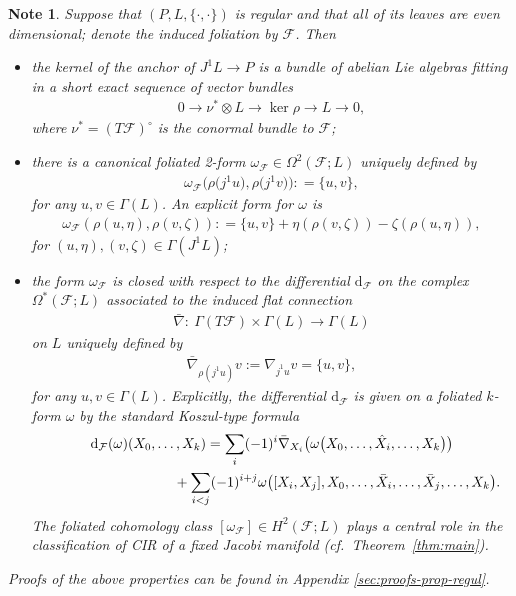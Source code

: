 \documentclass[10pt,a4paper]{amsart}
\numberwithin{equation}{section}
\newtheorem{Note}[Theorem]{Note}
\newcommand{\de}{\mathrm{d}} %
\newcommand{\JM}{(P,L,\{\cdot,\cdot\})} %
\begin{document}
\begin{Note}\label{obs:prop_jac_even}
Suppose that $\JM$ is regular and that all of its leaves are even dimensional; denote the induced foliation by $\mathcal{F}$. Then
 \begin{itemize}\itemsep=0pt
 \item the kernel of the anchor of $J^1L \to P$ is a bundle of abelian Lie algebras f\/itting in a short exact sequence of vector bundles
 \begin{gather} \label{eq:38}
 0 \to \nu^* \otimes L \to \ker \rho \to L \to 0,
 \end{gather}
 where $\nu^* = \left( T \mathcal{F}\right)^{\circ}$ is the conormal bundle to $\mathcal{F}$;
 \item there is a canonical foliated 2-form $\omega_{\mathcal{F}} \in\Omega^2(\mathcal{F};L)$ uniquely def\/ined by
 \begin{gather} \label{eq:29}
 \omega_{\mathcal{F}}\big(\rho\big(j^1 u\big), \rho\big(j^1 v\big)\big) : = \{u,v\},
 \end{gather}
 for any $u,v \in \Gamma(L)$. An explicit form for $\omega$ is
 \begin{gather*}
 \omega_{\mathcal{F}}(\rho(u,\eta),\rho(v,\zeta)) : = \{u,v\} + \eta(\rho(v,\zeta)) - \zeta(\rho(u,\eta)),
 \end{gather*}
 for $(u,\eta), (v,\zeta) \in \Gamma(J^1 L)$;
\item the form $\omega_{\mathcal{F}}$ is closed with respect to the dif\/ferential $\de_{\mathcal{F}}$ on the complex $\Omega^* (\mathcal{F};L)$ associated to the induced f\/lat connection
 \begin{gather*}%
 \bar{\nabla} \colon \ \Gamma(T \mathcal{F}) \times \Gamma(L) \to \Gamma(L)
 \end{gather*}
 on $L$ uniquely def\/ined by
 \begin{gather} \label{eq:26}
 \bar{\nabla}_{\rho(j^1u)} v := \nabla_{j^1 u}v = \{u,v\},
 \end{gather}
 for any $u,v \in \Gamma(L)$. Explicitly, the dif\/ferential $\de_{\mathcal{F}}$ is given on a foliated $k$-form $\omega$ by the standard Koszul-type formula
 \begin{gather*}
 \de_{\mathcal{F}}(\omega)(X_0,\ldots,X_k)= \sum_i(-1)^i\bar\nabla_{X_i}\big(\omega\big(X_0,\ldots,\hat X_i,\ldots, X_k\big)\big)\\
\hphantom{\de_{\mathcal{F}}(\omega)(X_0,\ldots,X_k)=}{} +\sum_{i<j}(-1)^{i+j}\omega\big([X_i,X_j], X_0,\ldots,\bar X_i,\ldots, \bar X_j,\ldots, X_k \big).
\end{gather*}
The foliated cohomology class $ [\omega_{\mathcal{F}}]\in H^2(\mathcal{F};L)$ plays a central role in the classif\/ication of CIR of a f\/ixed Jacobi manifold (cf.\ Theorem~\ref{thm:main}).
 \end{itemize}
Proofs of the above properties can be found in Appendix \ref{sec:proofs-prop-regul}.
\end{Note}
\end{document}
